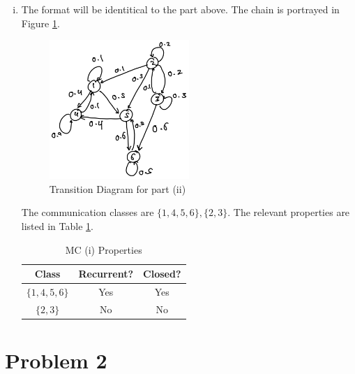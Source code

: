 \documentclass[12pt]{article}%
\begin{document}
\begin{enumerate}[i.]
  \item The format will be identitical to the part above. The chain is portrayed in Figure \ref{fig:mc2}.

        \begin{figure}[h]
          \centering
          \includegraphics[width=0.5\textwidth]{mc2}
          \caption{Transition Diagram for part (ii)}
          \label{fig:mc2}
        \end{figure}
        The communication classes are $\{1,4,5,6\},\{2,3\}$. The relevant properties are listed in Table \ref{tab:mc2}.

        \begin{table}[htbp]
          \centering
          \begin{tabular}{|c|c|c|}
            \hline
            Class & Recurrent? & Closed? \\
            \hline
            $\{1,4,5,6\}$ & Yes & Yes \\
            \hline
            $\{2,3\}$ & No & No \\
             \hline
          \end{tabular}
          \caption{MC (i) Properties}
          \label{tab:mc2}
        \end{table}

\end{enumerate}


\section{Problem 2}
\label{sec:problem-2}
\end{document}
